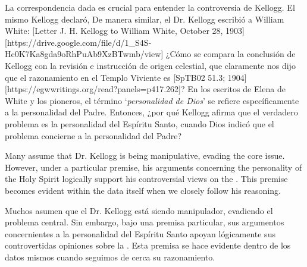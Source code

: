 La correspondencia dada es crucial para entender la controversia de Kellogg. El mismo Kellogg declaró,  De manera similar, el Dr. Kellogg escribió a William White: [Letter J. H. Kellogg to William White, October 28, 1903][https://drive.google.com/file/d/1\_S4S-Hc0K7Ka8gda9oRhPuAb9XzBTwmb/view] ¿Cómo se compara la conclusión de Kellogg con la revisión e instrucción de origen celestial, que claramente nos dijo que el razonamiento en el Templo Viviente es [SpTB02 51.3; 1904][https://egwwritings.org/read?panels=p417.262]? En los escritos de Elena de White y los pioneros, el término ‘\textit{personalidad de Dios}’ se refiere específicamente a la personalidad del Padre. Entonces, ¿por qué Kellogg afirma que el verdadero problema es la personalidad del Espíritu Santo, cuando Dios indicó que el problema concierne a la personalidad del Padre?


Many assume that Dr. Kellogg is being manipulative, evading the core issue. However, under a particular premise, his arguments concerning the personality of the Holy Spirit logically support his controversial views on the . This premise becomes evident within the data itself when we closely follow his reasoning.


Muchos asumen que el Dr. Kellogg está siendo manipulador, evadiendo el problema central. Sin embargo, bajo una premisa particular, sus argumentos concernientes a la personalidad del Espíritu Santo apoyan lógicamente sus controvertidas opiniones sobre la . Esta premisa se hace evidente dentro de los datos mismos cuando seguimos de cerca su razonamiento.


